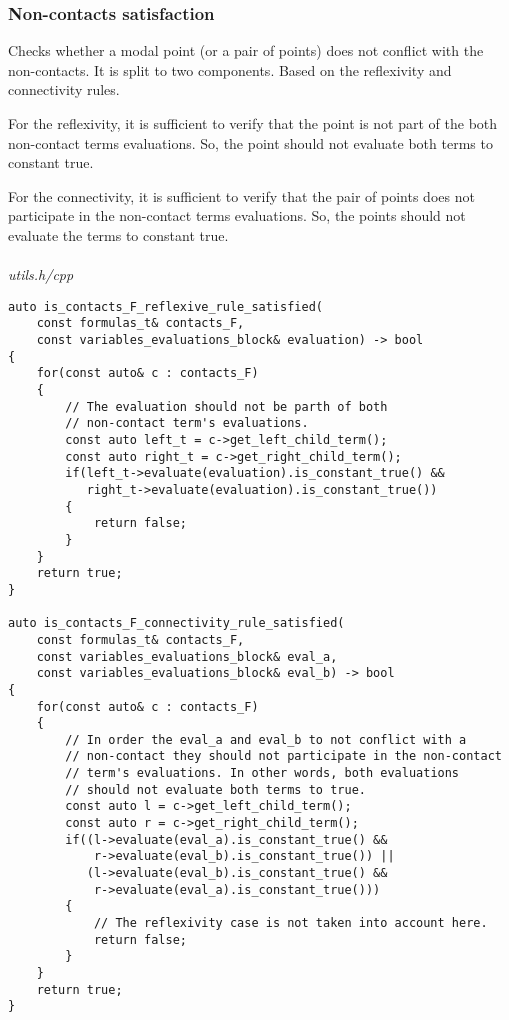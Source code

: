 \documentclass{article}
\begin{document}
	\newpage
	\subsubsection*{Non-contacts satisfaction}
	Checks whether a modal point (or a pair of points) does not conflict with the non-contacts. It is split to two components. Based on the reflexivity and connectivity rules.

	For the reflexivity, it is sufficient to verify that the point is not part of the both non-contact terms evaluations. So, the point should not evaluate both terms to constant true.

	For the connectivity, it is sufficient to verify that the pair of points does not participate in the non-contact terms evaluations. So, the points should not evaluate the terms to constant true.
	\\
	\\
\noindent
\textit{utils.h/cpp}
\begin{lstlisting}
auto is_contacts_F_reflexive_rule_satisfied(
	const formulas_t& contacts_F,
	const variables_evaluations_block& evaluation) -> bool
{
    for(const auto& c : contacts_F)
    {
        // The evaluation should not be parth of both
        // non-contact term's evaluations.
        const auto left_t = c->get_left_child_term();
        const auto right_t = c->get_right_child_term();
        if(left_t->evaluate(evaluation).is_constant_true() &&
           right_t->evaluate(evaluation).is_constant_true())
        {
            return false;
        }
    }
    return true;
}

auto is_contacts_F_connectivity_rule_satisfied(
	const formulas_t& contacts_F,
	const variables_evaluations_block& eval_a,
	const variables_evaluations_block& eval_b) -> bool
{
    for(const auto& c : contacts_F)
    {
        // In order the eval_a and eval_b to not conflict with a
        // non-contact they should not participate in the non-contact
        // term's evaluations. In other words, both evaluations
        // should not evaluate both terms to true.
        const auto l = c->get_left_child_term();
        const auto r = c->get_right_child_term();
        if((l->evaluate(eval_a).is_constant_true() &&
            r->evaluate(eval_b).is_constant_true()) ||
           (l->evaluate(eval_b).is_constant_true() &&
            r->evaluate(eval_a).is_constant_true()))
        {
            // The reflexivity case is not taken into account here.
            return false;
        }
    }
    return true;
}

\end{lstlisting}
\end{document}

